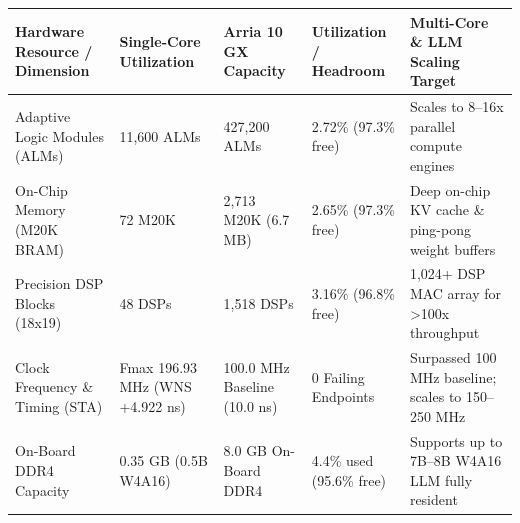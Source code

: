 \documentclass[11pt,a4paper]{article}
\begin{document}
{\footnotesize\renewcommand{\arraystretch}{1.14}\begin{longtable}{@{}L{0.21\textwidth}L{0.16\textwidth}L{0.16\textwidth}L{0.15\textwidth}L{0.22\textwidth}@{}}\toprule

\textbf{Hardware Resource /\allowbreak{} Dimension} & \textbf{Single-Core Utilization} & \textbf{Arria 10 GX Capacity} & \textbf{Utilization /\allowbreak{} Headroom} & \textbf{Multi-Core \& LLM Scaling Target}\\\midrule\endhead

Adaptive Logic Modules (\allowbreak{}ALMs)\allowbreak{} & 11,\allowbreak{}600 ALMs & 427,\allowbreak{}200 ALMs & 2.72\% (\allowbreak{}97.3\% free)\allowbreak{} & Scales to 8--16x parallel compute engines\\[2pt]

On-Chip Memory (\allowbreak{}M20K BRAM)\allowbreak{} & 72 M20K & 2,\allowbreak{}713 M20K (\allowbreak{}6.7 MB)\allowbreak{} & 2.65\% (\allowbreak{}97.3\% free)\allowbreak{} & Deep on-chip KV cache \& ping-pong weight buffers\\[2pt]

Precision DSP Blocks (\allowbreak{}18x19)\allowbreak{} & 48 DSPs & 1,\allowbreak{}518 DSPs & 3.16\% (\allowbreak{}96.8\% free)\allowbreak{} & 1,\allowbreak{}024+\allowbreak{} DSP MAC array for >100x throughput\\[2pt]

Clock Frequency \& Timing (\allowbreak{}STA)\allowbreak{} & Fmax 196.93 MHz (\allowbreak{}WNS +\allowbreak{}4.922 ns)\allowbreak{} & 100.0 MHz Baseline (\allowbreak{}10.0 ns)\allowbreak{} & 0 Failing Endpoints & Surpassed 100 MHz baseline; scales to 150--250 MHz\\[2pt]

On-Board DDR4 Capacity & 0.35 GB (\allowbreak{}0.5B W4A16)\allowbreak{} & 8.0 GB On-Board DDR4 & 4.4\% used (\allowbreak{}95.6\% free)\allowbreak{} & Supports up to 7B--8B W4A16 LLM fully resident\\[2pt]

\bottomrule\end{longtable}}
\end{document}
